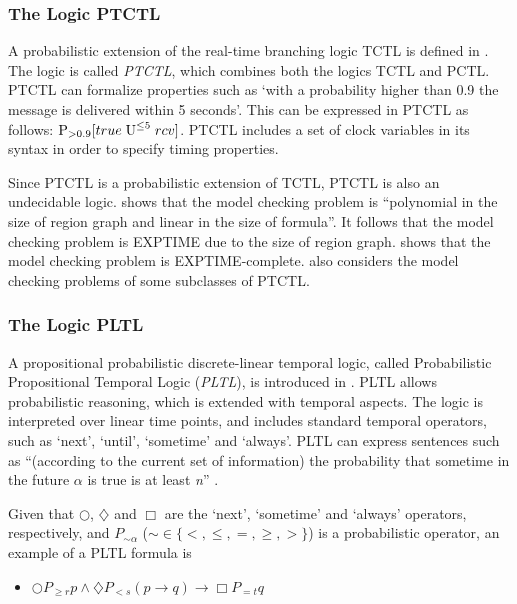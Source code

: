 \documentclass[11pt]{article}
\begin{document}
\subsubsection{The Logic PTCTL}

A probabilistic extension of the real-time branching logic TCTL is defined in \cite{KNR99}. The logic is called \emph{PTCTL}, which combines both the logics TCTL and PCTL. PTCTL can formalize properties such as `with a probability higher than 0.9 the message is delivered within 5 seconds'. This can be expressed in PTCTL as follows: $\textup{P}_{> 0.9} [true \; \textup{U}^{\leq 5} \; rcv]$.  PTCTL includes a set of clock variables in its syntax in order to specify timing properties. 

Since PTCTL is a probabilistic extension of TCTL, PTCTL is also an undecidable logic. \cite{KNR99} shows that the model checking problem is ``polynomial in the size of region graph and linear in the size of formula''. It follows that the model checking problem is EXPTIME due to the size of region graph. \cite{JLS07} shows that the model checking problem is EXPTIME-complete. \cite{JLS07} also considers the model checking problems of some subclasses of PTCTL.  

\subsubsection{The Logic PLTL}
A propositional probabilistic discrete-linear temporal logic, called Probabilistic Propositional Temporal Logic (\textit{PLTL}), is introduced in \cite{Ogn06}. PLTL allows probabilistic reasoning, which is extended with temporal aspects. The logic is interpreted over linear time points, and includes standard temporal operators, such as `next', `until', `sometime' and `always'. PLTL can express sentences such as ``(according to the current set of information) the probability that sometime in the future $\alpha$ is true is at least \textit{n}''  \cite{Ogn06}.

Given that $\bigcirc$, $\diamondsuit$ and $\Box$ are the `next', `sometime' and `always' operators, respectively, and $P_{\sim \alpha}$ ($\sim \in \{ <,\leq,=,\geq,> \}$) is a probabilistic operator, an example of a PLTL formula is  \cite{Ogn06}

\begin{itemize}
\item $\bigcirc P_{\geq r}p \wedge \diamondsuit P_{< s}(p \rightarrow q) \rightarrow \Box P_{=t} q$ \end{itemize}
\end{document}
